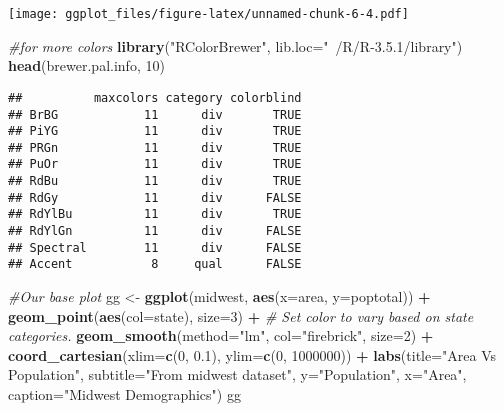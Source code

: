 \documentclass[]{article}
\newenvironment{Shaded}{\begin{snugshade}}{\end{snugshade}}
\newcommand{\KeywordTok}[1]{\textcolor[rgb]{0.13,0.29,0.53}{\textbf{#1}}}
\newcommand{\DataTypeTok}[1]{\textcolor[rgb]{0.13,0.29,0.53}{#1}}
\newcommand{\DecValTok}[1]{\textcolor[rgb]{0.00,0.00,0.81}{#1}}
\newcommand{\FloatTok}[1]{\textcolor[rgb]{0.00,0.00,0.81}{#1}}
\newcommand{\StringTok}[1]{\textcolor[rgb]{0.31,0.60,0.02}{#1}}
\newcommand{\CommentTok}[1]{\textcolor[rgb]{0.56,0.35,0.01}{\textit{#1}}}
\newcommand{\OperatorTok}[1]{\textcolor[rgb]{0.81,0.36,0.00}{\textbf{#1}}}
\newcommand{\NormalTok}[1]{#1}
\begin{document}
\texttt{[image: ggplot\_files/figure-latex/unnamed-chunk-6-4.pdf]}

\begin{Shaded}
\begin{Highlighting}[]
\CommentTok{#for more colors}
\KeywordTok{library}\NormalTok{(}\StringTok{"RColorBrewer"}\NormalTok{, }\DataTypeTok{lib.loc=}\StringTok{"~/R/R-3.5.1/library"}\NormalTok{)}
\KeywordTok{head}\NormalTok{(brewer.pal.info, }\DecValTok{10}\NormalTok{)}
\end{Highlighting}
\end{Shaded}

\begin{verbatim}
##          maxcolors category colorblind
## BrBG            11      div       TRUE
## PiYG            11      div       TRUE
## PRGn            11      div       TRUE
## PuOr            11      div       TRUE
## RdBu            11      div       TRUE
## RdGy            11      div      FALSE
## RdYlBu          11      div       TRUE
## RdYlGn          11      div      FALSE
## Spectral        11      div      FALSE
## Accent           8     qual      FALSE
\end{verbatim}

\begin{Shaded}
\begin{Highlighting}[]
\CommentTok{#Our base plot}
\NormalTok{gg <-}\StringTok{ }\KeywordTok{ggplot}\NormalTok{(midwest, }\KeywordTok{aes}\NormalTok{(}\DataTypeTok{x=}\NormalTok{area, }\DataTypeTok{y=}\NormalTok{poptotal)) }\OperatorTok{+}\StringTok{ }
\StringTok{  }\KeywordTok{geom_point}\NormalTok{(}\KeywordTok{aes}\NormalTok{(}\DataTypeTok{col=}\NormalTok{state), }\DataTypeTok{size=}\DecValTok{3}\NormalTok{) }\OperatorTok{+}\StringTok{  }\CommentTok{# Set color to vary based on state categories.}
\StringTok{  }\KeywordTok{geom_smooth}\NormalTok{(}\DataTypeTok{method=}\StringTok{"lm"}\NormalTok{, }\DataTypeTok{col=}\StringTok{"firebrick"}\NormalTok{, }\DataTypeTok{size=}\DecValTok{2}\NormalTok{) }\OperatorTok{+}\StringTok{ }
\StringTok{  }\KeywordTok{coord_cartesian}\NormalTok{(}\DataTypeTok{xlim=}\KeywordTok{c}\NormalTok{(}\DecValTok{0}\NormalTok{, }\FloatTok{0.1}\NormalTok{), }\DataTypeTok{ylim=}\KeywordTok{c}\NormalTok{(}\DecValTok{0}\NormalTok{, }\DecValTok{1000000}\NormalTok{)) }\OperatorTok{+}\StringTok{ }
\StringTok{  }\KeywordTok{labs}\NormalTok{(}\DataTypeTok{title=}\StringTok{"Area Vs Population"}\NormalTok{, }\DataTypeTok{subtitle=}\StringTok{"From midwest dataset"}\NormalTok{, }\DataTypeTok{y=}\StringTok{"Population"}\NormalTok{, }\DataTypeTok{x=}\StringTok{"Area"}\NormalTok{, }\DataTypeTok{caption=}\StringTok{"Midwest Demographics"}\NormalTok{)}
\NormalTok{gg}
\end{Highlighting}
\end{Shaded}
\end{document}
